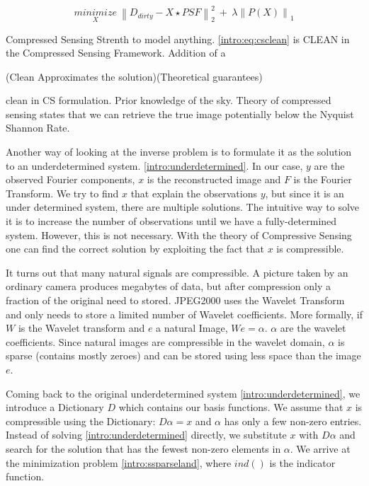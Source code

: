 \begin{equation}\label{intro:eq:csclean}
\underset{X}{minimize} \: \left \| D_{dirty} - X \star PSF \right \|_2^2 \: + \: \lambda \left \| P(X) \right \|_1
\end{equation}

Compressed Sensing Strenth to model anything. \eqref{intro:eq:csclean} is CLEAN in the Compressed Sensing Framework. Addition of a 




(Clean Approximates the solution)(Theoretical guarantees)

clean in CS formulation. Prior knowledge of the sky. Theory of compressed sensing states that we can retrieve the true image potentially below the Nyquist Shannon Rate.

Another way of looking at the inverse problem is to formulate it as the solution to an underdetermined system. \eqref{intro:underdetermined}. In our case, $y$ are the observed Fourier components, $x$ is the reconstructed image and $F$ is the Fourier Transform. We try to find $x$ that explain the observations $y$, but since it is an under determined system, there are multiple solutions. The intuitive way to solve it is to increase the number of observations until we have a fully-determined system. However, this is not necessary. With the theory of Compressive Sensing one can find the correct solution by exploiting the fact that $x$ is compressible.

It turns out that many natural signals are compressible. A picture taken by an ordinary camera produces megabytes of data, but after compression only a fraction of the original need to stored. JPEG2000 uses the Wavelet Transform and only needs to store a limited number of Wavelet coefficients. More formally, if $W$ is the Wavelet transform and $e$ a natural Image, $We = \alpha$. $\alpha$ are the wavelet coefficients. Since natural images are compressible in the wavelet domain, $\alpha$ is sparse (contains mostly zeroes) and can be stored using less space than the image $e$.

Coming back to the original underdetermined system \eqref{intro:underdetermined}, we introduce a Dictionary $D$ which contains our basis functions. We assume that $x$ is compressible using the Dictionary: $D\alpha = x$ and $\alpha$ has only a few non-zero entries. Instead of solving \eqref{intro:underdetermined} directly, we substitute $x$ with $D\alpha$ and search for the solution that has the fewest non-zero elements in $\alpha$. We arrive at the minimization problem \eqref{intro:ssparseland}, where $\mathit{ind}()$ is the indicator function. 

